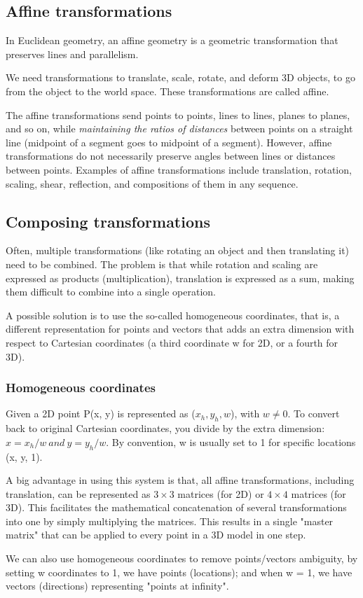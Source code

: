 \subsection{Affine transformations}
\begin{definition}
    In Euclidean geometry, an affine geometry is a geometric transformation that preserves lines and parallelism.
\end{definition}
We need transformations to translate, scale, rotate, and deform 3D objects, to go from the object to the world space. These transformations are called affine.\par
The affine transformations send points to points, lines to lines, planes to planes, and so on, while \textit { maintaining the ratios of distances} between points on a straight line (midpoint of a segment goes to midpoint of a segment). However, affine transformations do not necessarily preserve angles between lines or distances between points. Examples of affine transformations include translation, rotation, scaling, shear, reflection, and compositions of them in any sequence.

\subsection{Composing transformations}
Often, multiple transformations (like rotating an object and then translating it) need to be combined. The problem is that while rotation and scaling are expressed as products (multiplication), translation is expressed as a sum, making them difficult to combine into a single operation.\par
A possible solution is to use the so-called homogeneous coordinates, that is, a different representation for points and vectors that adds an extra dimension with respect to Cartesian coordinates (a third coordinate w for 2D, or a fourth for 3D).

\subsubsection{Homogeneous coordinates}
Given a 2D point P(x, y) is represented as (\(x_h, y_h, w\)), with \(w \neq 0\). To convert back to original Cartesian coordinates, you divide by the extra dimension: \(x = x_h/w \ and \ y = y_h/w\). By convention, w is usually set to 1 for specific locations (x, y, 1).\par
A big advantage in using this system is that, all affine transformations, including translation, can be represented as \(3 \times 3 \) matrices (for 2D) or \(4 \times 4\) matrices (for 3D). This facilitates the mathematical concatenation of several transformations into one by simply multiplying the matrices. This results in a single "master matrix" that can be applied to every point in a 3D model in one step. \par
We can also use homogeneous coordinates to remove points/vectors ambiguity, by setting w coordinates to 1, we have points (locations); and when w = 1, we have vectors (directions) representing "points at infinity".


